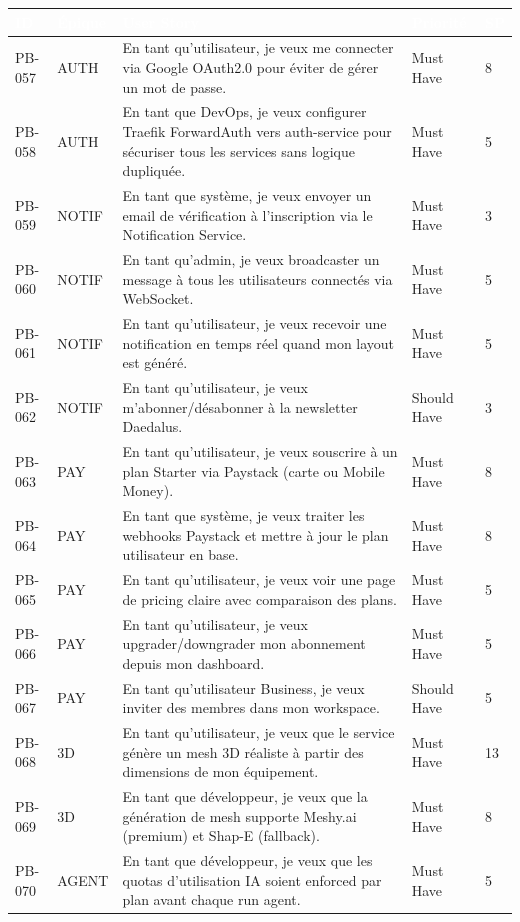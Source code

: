 \documentclass[12pt,a4paper]{article}
\begin{document}
\begin{longtable}{|l|l|X|l|l|}
\hline
\rowcolor{tablehead}
\textcolor{white}{\textbf{ID}} &
\textcolor{white}{\textbf{Épique}} &
\textcolor{white}{\textbf{User Story}} &
\textcolor{white}{\textbf{Priorité}} &
\textcolor{white}{\textbf{SP}} \\
\endhead
\hline
PB-057 & AUTH & En tant qu'utilisateur, je veux me connecter via Google OAuth2.0 pour éviter de gérer un mot de passe. & Must Have & 8 \\
\hline
\rowcolor{tablerow}
PB-058 & AUTH & En tant que DevOps, je veux configurer Traefik ForwardAuth vers auth-service pour sécuriser tous les services sans logique dupliquée. & Must Have & 5 \\
\hline
PB-059 & NOTIF & En tant que système, je veux envoyer un email de vérification à l'inscription via le Notification Service. & Must Have & 3 \\
\hline
\rowcolor{tablerow}
PB-060 & NOTIF & En tant qu'admin, je veux broadcaster un message à tous les utilisateurs connectés via WebSocket. & Must Have & 5 \\
\hline
PB-061 & NOTIF & En tant qu'utilisateur, je veux recevoir une notification en temps réel quand mon layout est généré. & Must Have & 5 \\
\hline
\rowcolor{tablerow}
PB-062 & NOTIF & En tant qu'utilisateur, je veux m'abonner/désabonner à la newsletter Daedalus. & Should Have & 3 \\
\hline
PB-063 & PAY & En tant qu'utilisateur, je veux souscrire à un plan Starter via Paystack (carte ou Mobile Money). & Must Have & 8 \\
\hline
\rowcolor{tablerow}
PB-064 & PAY & En tant que système, je veux traiter les webhooks Paystack et mettre à jour le plan utilisateur en base. & Must Have & 8 \\
\hline
PB-065 & PAY & En tant qu'utilisateur, je veux voir une page de pricing claire avec comparaison des plans. & Must Have & 5 \\
\hline
\rowcolor{tablerow}
PB-066 & PAY & En tant qu'utilisateur, je veux upgrader/downgrader mon abonnement depuis mon dashboard. & Must Have & 5 \\
\hline
PB-067 & PAY & En tant qu'utilisateur Business, je veux inviter des membres dans mon workspace. & Should Have & 5 \\
\hline
\rowcolor{tablerow}
PB-068 & 3D & En tant qu'utilisateur, je veux que le service génère un mesh 3D réaliste à partir des dimensions de mon équipement. & Must Have & 13 \\
\hline
PB-069 & 3D & En tant que développeur, je veux que la génération de mesh supporte Meshy.ai (premium) et Shap-E (fallback). & Must Have & 8 \\
\hline
\rowcolor{tablerow}
PB-070 & AGENT & En tant que développeur, je veux que les quotas d'utilisation IA soient enforced par plan avant chaque run agent. & Must Have & 5 \\
\hline
\end{longtable}
\end{document}
